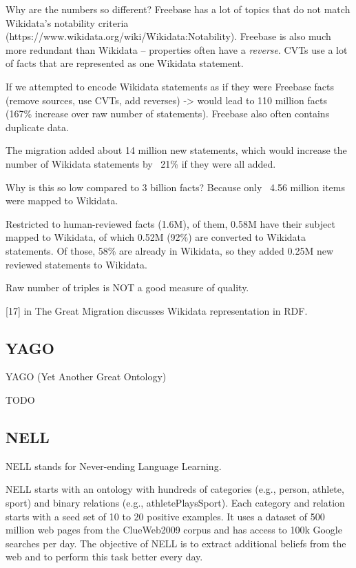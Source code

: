 Why are the numbers so different? Freebase has a lot of topics that do not match
Wikidata's notability criteria (https://www.wikidata.org/wiki/Wikidata:Notability).
Freebase is also much more redundant than Wikidata -- properties often have a
\textit{reverse}.
CVTs use a lot of facts that are represented as one Wikidata statement.

If we attempted to encode Wikidata statements as if they were Freebase facts
(remove sources, use CVTs, add reverses) -> would lead to 110 million facts
(167\% increase over raw number of statements).
Freebase also often contains duplicate data.

The migration added about 14 million new statements, which would increase the
number of Wikidata statements by ~21\% if they were all added.

Why is this so low compared to 3 billion facts? Because only ~4.56 million items
were mapped to Wikidata.

Restricted to human-reviewed facts (1.6M), of them, 0.58M have their subject
mapped to Wikidata, of which 0.52M (92\%) are converted to Wikidata statements.
Of those, 58\% are already in Wikidata, so they added 0.25M new reviewed
statements to Wikidata.

Raw number of triples is NOT a good measure of quality.

[17] in The Great Migration discusses Wikidata representation in RDF.

\subsection{YAGO}

YAGO (Yet Another Great Ontology)

TODO

\subsection{NELL}

NELL stands for Never-ending Language Learning.

NELL starts with an ontology with hundreds of categories (e.g., person, athlete,
sport) and binary relations (e.g., athletePlaysSport). Each category and
relation starts with a seed set of 10 to 20 positive examples.
It uses a dataset of 500 million web pages from the ClueWeb2009 corpus and
has access to 100k Google searches per day.
The objective of NELL is to extract additional beliefs from the web and to
perform this task better every day.


